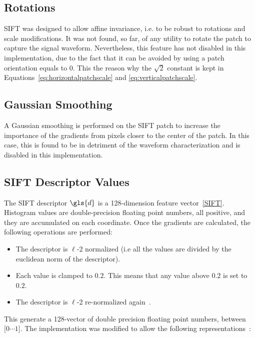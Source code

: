 \subsection{Rotations}

SIFT was designed to allow affine invariance, i.e. to be robust to rotations and scale modifications.  It was not found, so far, of any utility to rotate the patch to capture the signal waveform.  Nevertheless, this feature has not disabled in this implementation, due to the fact that it can be avoided by using a patch orientation equals to $0$.  This the reason why the $\sqrt{2}$ constant is kept in Equations~\ref{eq:horizontalpatchscale} and \ref{eq:verticalpatchscale}.

\subsection{Gaussian Smoothing}

A Gaussian smoothing is performed on the SIFT patch to increase the importance of the gradients from pixels closer to the center of the patch.  In this case, this is found to be in detriment of the waveform characterization and is disabled in this implementation.

\subsection{SIFT Descriptor Values}

The SIFT descriptor $\gls{d}$ is a 128-dimension feature vector~\ref{SIFT}.  Histogram values are double-precision floating point numbers, all positive, and they are accumulated on each coordinate.  Once the gradients are calculated, the following operations are performed:

\begin{itemize}
\item The descriptor is $\ell$-2 normalized (i.e all the values are divided by the euclidean norm of the descriptor).
\item Each value is clamped to $0.2$.  This means that any value above $0.2$ is set to $0.2$.
\item The descriptor is $\ell$-2 re-normalized again~\cite{Rey-Otero2014}.
\end{itemize}

This generate a 128-vector of double precision floating point numbers, between $  \big[  0 \cdots 1 \big] $.  The implementation was modified to allow the following representations~\cite{Arandjelovic2012}:

